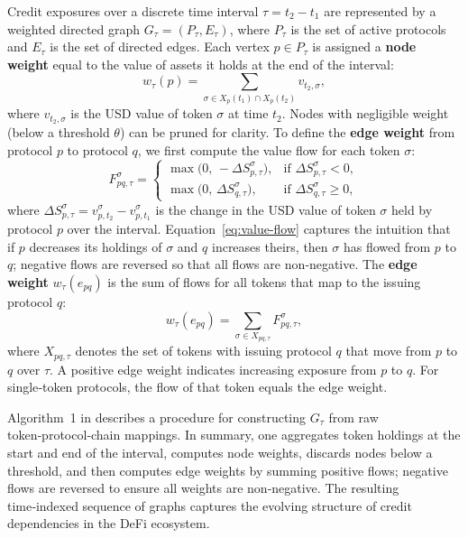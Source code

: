 \documentclass[preprint,12pt]{elsarticle}
\begin{document}
Credit exposures over a discrete time interval $\tau = t_2 - t_1$ are represented by a weighted directed graph $G_\tau = (P_\tau, E_\tau)$, where $P_\tau$ is the set of active protocols and $E_\tau$ is the set of directed edges.  Each vertex $p\in P_\tau$ is assigned a \textbf{node weight} equal to the value of assets it holds at the end of the interval:
\begin{equation}
w_\tau(p) = \sum_{\sigma\in X_p(t_1)\cap X_p(t_2)} v_{t_2,\sigma},
\label{eq:node-weight}
\end{equation}
where $v_{t_2,\sigma}$ is the USD value of token $\sigma$ at time $t_2$.  Nodes with negligible weight (below a threshold $\theta$) can be pruned for clarity.  To define the \textbf{edge weight} from protocol $p$ to protocol $q$, we first compute the value flow for each token $\sigma$:
\begin{equation}
F^{\sigma}_{p q,\tau} =
\begin{cases}
\max\bigl(0,\, -\Delta S^{\sigma}_{p,\tau}\bigr), & \text{if } \Delta S^{\sigma}_{p,\tau} < 0,\\
\max\bigl(0,\,\Delta S^{\sigma}_{q,\tau}\bigr), & \text{if } \Delta S^{\sigma}_{q,\tau} \ge 0,
\end{cases}
\label{eq:value-flow}
\end{equation}
where $\Delta S^{\sigma}_{p,\tau}=v_{p,t_2}^{\sigma}-v_{p,t_1}^{\sigma}$ is the change in the USD value of token $\sigma$ held by protocol $p$ over the interval.  Equation~\eqref{eq:value-flow} captures the intuition that if $p$ decreases its holdings of $\sigma$ and $q$ increases theirs, then $\sigma$ has flowed from $p$ to $q$; negative flows are reversed so that all flows are non‑negative.  The \textbf{edge weight} $w_\tau(e_{p q})$ is the sum of flows for all tokens that map to the issuing protocol $q$:
\begin{equation}
w_\tau(e_{p q}) = \sum_{\sigma \in X_{p q, \tau}} F^{\sigma}_{p q,\tau},
\label{eq:edge-weight}
\end{equation}
where $X_{p q,\tau}$ denotes the set of tokens with issuing protocol $q$ that move from $p$ to $q$ over $\tau$.  A positive edge weight indicates increasing exposure from $p$ to $q$.  For single‑token protocols, the flow of that token equals the edge weight.

Algorithm~1 in \cite{wu2025} describes a procedure for constructing $G_\tau$ from raw token‑protocol‑chain mappings.  In summary, one aggregates token holdings at the start and end of the interval, computes node weights, discards nodes below a threshold, and then computes edge weights by summing positive flows; negative flows are reversed to ensure all weights are non‑negative.  The resulting time‑indexed sequence of graphs captures the evolving structure of credit dependencies in the DeFi ecosystem.
\end{document}

